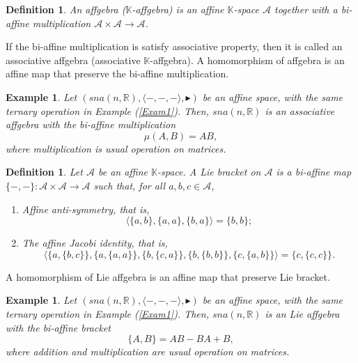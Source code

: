 \documentclass[14pt]{article}
\theoremstyle{Definition}
\newtheorem{Def}[thm]{Definition}
\newtheorem{Exam}[thm]{Example}
\theoremstyle{remark}
\begin{document}
\begin{Def}\cite{Brz1}
 An affgebra ($\mathbb{K}$-affgebra) is an affine $\mathbb{K}$-space $\mathcal{A}$ together with a bi-affine multiplication $\mathcal{A}\times \mathcal{A}\rightarrow\mathcal{A}$.
\end{Def}
If the bi-affine multiplication is satisfy associative property, then it is called an associative affgebra (associative $\mathbb{K}$-affgebra).
A homomorphism of affgebra is an affine map that preserve the bi-affine multiplication.
\begin{Exam}
Let $(sna(n,\mathbb{R}),\langle-,-,-\rangle,\blacktriangleright)$ be an affine space, with the same ternary operation in Example (\ref{Exam1}). Then, $sna(n,\mathbb{R})$ is an associative affgebra with the bi-affine multiplication 
$$\mu(A,B)=AB,$$
where multiplication is usual operation on matrices.
\end{Exam}
\begin{Def}\cite{And2}
Let $\mathcal{A}$ be an affine $\mathbb{K}$-space. A Lie bracket on $\mathcal{A}$ is a bi-affine map $\{-,-\}:\mathcal{A}\times\mathcal{A}\rightarrow\mathcal{A}$ such that, for all $a,b,c\in \mathcal{A}$,
\begin{enumerate}
\item[(i)] Affine anti-symmetry, that is,
$$
\langle\{a,b\},\{a,a\},\{b,a\}\rangle=\{b,b\};
$$
\item[(ii)] The affine Jacobi identity, that is,
$$
\langle\{a,\{b,c\}\},\{a,\{a,a\}\},\{b,\{c,a\}\},\{b,\{b,b\}\},\{c,\{a,b\}\}\rangle=\{c,\{c,c\}\}.
$$
\end{enumerate}
\end{Def}
A homomorphism of Lie affgebra is an affine map that preserve Lie bracket.
\begin{Exam}
Let $(sna(n,\mathbb{R}),\langle-,-,-\rangle,\blacktriangleright)$ be an affine space, with the same ternary operation in Example (\ref{Exam1}). Then, $sna(n,\mathbb{R})$ is an Lie affgebra with the bi-affine bracket 
$$\{A,B\}=AB-BA+B,$$
where addition and multiplication are usual operation on matrices.
\end{Exam}
\end{document}
